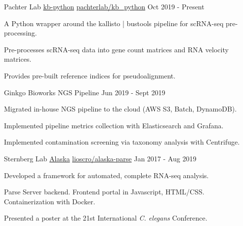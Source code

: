 \begin{cventries}
\cventry
  {Pachter Lab} %
  {\href{https://github.com/pachterlab/kb_python}{kb-python}} %
  {\faGithub\phantom{a}\href{https://github.com/pachterlab/kb_python}{pachterlab/kb\_python}} %
  {Oct 2019 - Present} %
  {
    \begin{cvitems} %
      \item {A Python wrapper around the kallisto | bustools pipeline for scRNA-seq pre-processing.}
      \item {Pre-processes scRNA-seq data into gene count matrices and RNA velocity matrices.}
      \item {Provides pre-built reference indices for pseudoalignment.}
    \end{cvitems}
  }

\cventry
    {Ginkgo Bioworks}
    {NGS Pipeline}
    {}
    {Jun 2019 - Sept 2019}
    {
     \begin{cvitems} %
       \item {Migrated in-house NGS pipeline to the cloud (AWS S3, Batch, DynamoDB).}
       \item {Implemented pipeline metrics collection with Elasticsearch and Grafana.}
       \item {Implemented contamination screening via taxonomy analysis with Centrifuge.}
      \end{cvitems}
    }

\cventry
    {Sternberg Lab}
    {\href{https://github.com/Lioscro/alaska-parse}{Alaska}}
    {\faGithub\phantom{a}\href{https://github.com/Lioscro/alaska-parse}{lioscro/alaska-parse}}
    {Jan 2017 - Aug 2019}
    {
     \begin{cvitems} %
       \item Developed a framework for automated, complete RNA-seq analysis.
       \item Parse Server backend. Frontend portal in Javascript, HTML/CSS. Containerization with Docker.
       \item Presented a poster at the 21st International \textit{C. elegans} Conference.
      \end{cvitems}
    }

\end{cventries}
